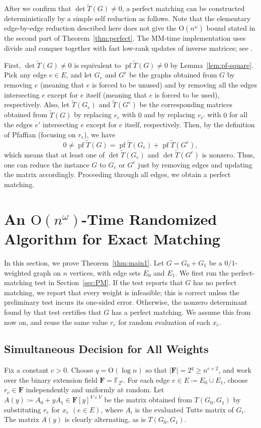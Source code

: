 \documentclass[11pt, a4paper]{article}
\theoremstyle{plain}
\theoremstyle{definition}
\theoremstyle{remark}
\newcommand{\bF}{\mathbf{F}}
\DeclareMathOperator{\pf}{pf}
\begin{document}
After we confirm that $\det\tilde{T}(G) \neq 0$, a perfect matching can be constructed deterministically by a simple self reduction as follows.
Note that the elementary edge-by-edge reduction described here does not give the $\mathrm{O}(n^\omega)$ bound stated in the second part of Theorem~\ref{thm:perfect}.
The MM-time implementation uses divide and conquer together with fast low-rank updates of inverse matrices; see \cite{MS2004, Harvey2009}.

First, $\det \tilde{T}(G) \neq 0$ is equivalent to $\pf \tilde{T}(G) \neq 0$ by Lemma~\ref{lem:pf-square}.
Pick any edge $e \in E$, and let $G_e$ and $G^e$ be the graphs obtained from $G$ by removing $e$ (meaning that $e$ is forced to be unused) and by removing all the edges intersecting $e$ except for $e$ itself (meaning that $e$ is forced to be used), respectively. 
Also, let $\tilde{T}(G_e)$ and $\tilde{T}(G^e)$ be the corresponding matrices obtained from $\tilde{T}(G)$ by replacing $r_e$ with $0$ and by replacing $r_{e'}$ with $0$ for all the edges $e'$ intersecting $e$ except for $e$ itself, respectively.
Then, by the definition of Pfaffian (focusing on $r_e$), we have
\[0 \neq \pf \tilde{T}(G) = \pf \tilde{T}(G_e) + \pf \tilde{T}(G^e),\]
which means that at least one of $\det \tilde{T}(G_e)$ and $\det \tilde{T}(G^e)$ is nonzero.
Thus, one can reduce the instance $G$ to $G_e$ or $G^e$ just by removing edges and updating the matrix accordingly.
Proceeding through all edges, we obtain a perfect matching.



\section{An $\mathrm{O}(n^\omega)$-Time Randomized Algorithm for Exact Matching}\label{sec:main}
In this section, we prove Theorem~\ref{thm:main1}.
Let $G=G_0+G_1$ be a $0/1$-weighted graph on $n$ vertices, with edge sets $E_0$ and $E_1$.
We first run the perfect-matching test in Section~\ref{sec:PM}.
If the test reports that $G$ has no perfect matching, we report that every weight is infeasible; this is correct unless the preliminary test incurs its one-sided error.
Otherwise, the nonzero determinant found by that test certifies that $G$ has a perfect matching.
We assume this from now on, and reuse the same value $r_e$ for random evaluation of each $x_e$.

\subsection{Simultaneous Decision for All Weights}\label{sec:decision}
Fix a constant $c>0$.
Choose $q = \mathrm{O}(\log n)$ so that $|\bF|=2^q\ge n^{c+2}$, and work over the binary extension field $\bF=\mathbb{F}_{2^q}$.
For each edge $e\in E \coloneqq E_0\mathbin{\dot\cup}E_1$, choose $r_e\in\bF$ independently and uniformly at random.
Let $A(y) \coloneqq A_0+yA_1\in\bF[y]^{V\times V}$ be the matrix obtained from $T(G_0,G_1)$ by substituting $r_e$ for $x_e$ $(e \in E)$, where $A_i$ is the evaluated Tutte matrix of $G_i$.
The matrix $A(y)$ is clearly alternating, as is $T(G_0, G_1)$.
\end{document}
